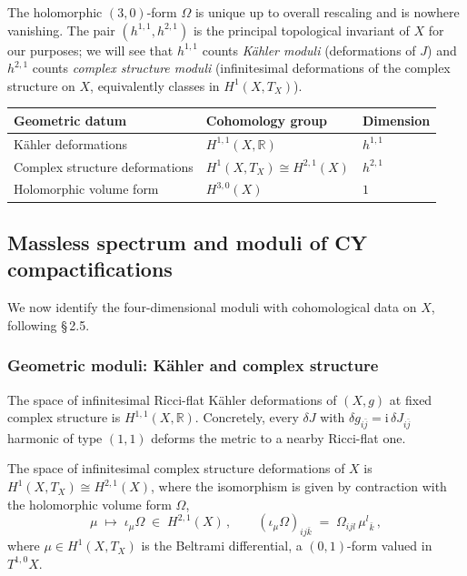 The holomorphic $(3,0)$-form $\Omega$ is unique up to overall
rescaling and is nowhere vanishing. The pair
$(h^{1,1},h^{2,1})$ is the principal topological invariant of $X$ for
our purposes; we will see that $h^{1,1}$ counts \emph{K\"ahler
moduli} (deformations of $J$) and $h^{2,1}$ counts \emph{complex
structure moduli} (infinitesimal deformations of the complex
structure on $X$, equivalently classes in $H^1(X, T_X)$).

\begin{center}
\begin{tabular}{lll}
\toprule
Geometric datum & Cohomology group & Dimension \\
\midrule
K\"ahler deformations & $H^{1,1}(X,\mathbb{R})$ & $h^{1,1}$ \\
Complex structure deformations & $H^1(X,T_X)\cong H^{2,1}(X)$ & $h^{2,1}$ \\
Holomorphic volume form & $H^{3,0}(X)$ & $1$ \\
\bottomrule
\end{tabular}
\end{center}

\subsection{Massless spectrum and moduli of CY compactifications}\label{ssec:L1-moduli}

We now identify the four-dimensional moduli with cohomological data
on $X$, following \cite{McAllister:2025qwq} \S\,2.5.

\subsubsection{Geometric moduli: K\"ahler and complex structure}

\begin{proposition}\label{prop:K-moduli}
The space of infinitesimal Ricci-flat K\"ahler deformations of
$(X,g)$ at fixed complex structure is
$H^{1,1}(X,\mathbb{R})$. Concretely, every $\delta J$ with
$\delta g_{i\bar j} = \mathrm{i}\,\delta J_{i\bar j}$ harmonic of type
$(1,1)$ deforms the metric to a nearby Ricci-flat one.
\end{proposition}

\begin{proposition}\label{prop:CS-moduli}
The space of infinitesimal complex structure deformations of $X$ is
$H^1(X,T_X) \cong H^{2,1}(X)$, where the isomorphism is given by
contraction with the holomorphic volume form $\Omega$,
\begin{equation}
    \mu \;\mapsto\; \iota_{\mu}\Omega
        \;\in\; H^{2,1}(X) \,,
    \qquad
    (\iota_{\mu}\Omega)_{i j \bar k}
        \;=\; \Omega_{i j l}\, \mu^{l}{}_{\bar k} \,,
\end{equation}
where $\mu \in H^1(X,T_X)$ is the Beltrami differential, a $(0,1)$-form valued in $T^{1,0}X$.
\end{proposition}

